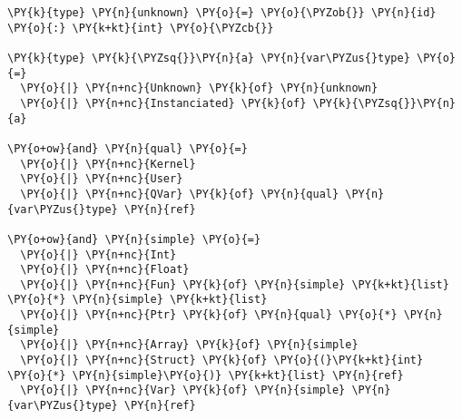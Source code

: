 \begin{Verbatim}[commandchars=\\\{\}]
\PY{k}{type} \PY{n}{unknown} \PY{o}{=} \PY{o}{\PYZob{}} \PY{n}{id} \PY{o}{:} \PY{k+kt}{int} \PY{o}{\PYZcb{}}

\PY{k}{type} \PY{k}{\PYZsq{}}\PY{n}{a} \PY{n}{var\PYZus{}type} \PY{o}{=}
  \PY{o}{|} \PY{n+nc}{Unknown} \PY{k}{of} \PY{n}{unknown}
  \PY{o}{|} \PY{n+nc}{Instanciated} \PY{k}{of} \PY{k}{\PYZsq{}}\PY{n}{a}

\PY{o+ow}{and} \PY{n}{qual} \PY{o}{=}
  \PY{o}{|} \PY{n+nc}{Kernel}
  \PY{o}{|} \PY{n+nc}{User}
  \PY{o}{|} \PY{n+nc}{QVar} \PY{k}{of} \PY{n}{qual} \PY{n}{var\PYZus{}type} \PY{n}{ref}

\PY{o+ow}{and} \PY{n}{simple} \PY{o}{=}
  \PY{o}{|} \PY{n+nc}{Int}
  \PY{o}{|} \PY{n+nc}{Float}
  \PY{o}{|} \PY{n+nc}{Fun} \PY{k}{of} \PY{n}{simple} \PY{k+kt}{list} \PY{o}{*} \PY{n}{simple} \PY{k+kt}{list}
  \PY{o}{|} \PY{n+nc}{Ptr} \PY{k}{of} \PY{n}{qual} \PY{o}{*} \PY{n}{simple}
  \PY{o}{|} \PY{n+nc}{Array} \PY{k}{of} \PY{n}{simple}
  \PY{o}{|} \PY{n+nc}{Struct} \PY{k}{of} \PY{o}{(}\PY{k+kt}{int} \PY{o}{*} \PY{n}{simple}\PY{o}{)} \PY{k+kt}{list} \PY{n}{ref}
  \PY{o}{|} \PY{n+nc}{Var} \PY{k}{of} \PY{n}{simple} \PY{n}{var\PYZus{}type} \PY{n}{ref}
\end{Verbatim}
